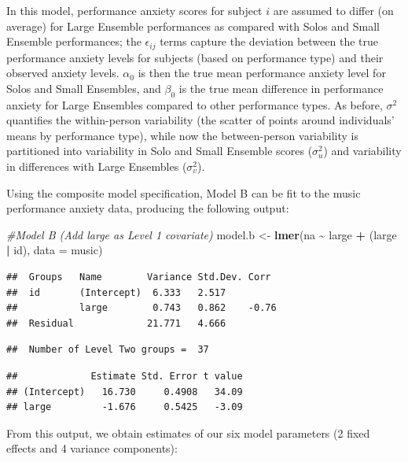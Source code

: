 \documentclass[
]{krantz}
\newenvironment{Shaded}{\begin{snugshade}}{\end{snugshade}}
\newcommand{\AttributeTok}[1]{\textcolor[rgb]{0.27,0.27,0.27}{#1}}
\newcommand{\CommentTok}[1]{\textcolor[rgb]{0.37,0.37,0.37}{\textit{#1}}}
\newcommand{\FunctionTok}[1]{\textcolor[rgb]{0.27,0.27,0.27}{\textbf{#1}}}
\newcommand{\NormalTok}[1]{#1}
\newcommand{\OtherTok}[1]{\textcolor[rgb]{0.37,0.37,0.37}{#1}}
\newcommand{\SpecialCharTok}[1]{\textcolor[rgb]{0.43,0.43,0.43}{\textbf{#1}}}
\begin{document}
In this model, performance anxiety scores for subject \(i\) are assumed to differ (on average) for Large Ensemble performances as compared with Solos and Small Ensemble performances; the \(\epsilon_{ij}\) terms capture the deviation between the true performance anxiety levels for subjects (based on performance type) and their observed anxiety levels. \(\alpha_{0}\) is then the true mean performance anxiety level for Solos and Small Ensembles, and \(\beta_{0}\) is the true mean difference in performance anxiety for Large Ensembles compared to other performance types. As before, \(\sigma^2\) quantifies the within-person variability (the scatter of points around individuals' means by performance type), while now the between-person variability is partitioned into variability in Solo and Small Ensemble scores (\(\sigma_{u}^{2}\)) and variability in differences with Large Ensembles (\(\sigma_{v}^{2}\)).

Using the composite model specification, Model B can be fit to the music performance anxiety data, producing the following output:

\begin{Shaded}
\begin{Highlighting}[]
\CommentTok{\#Model B (Add large as Level 1 covariate)}
\NormalTok{model.b }\OtherTok{\textless{}{-}} \FunctionTok{lmer}\NormalTok{(na }\SpecialCharTok{\textasciitilde{}}\NormalTok{ large }\SpecialCharTok{+}\NormalTok{  (large }\SpecialCharTok{|}\NormalTok{ id), }\AttributeTok{data =}\NormalTok{ music)}
\end{Highlighting}
\end{Shaded}

\begin{verbatim}
##  Groups   Name        Variance Std.Dev. Corr 
##  id       (Intercept)  6.333   2.517         
##           large        0.743   0.862    -0.76
##  Residual             21.771   4.666
\end{verbatim}

\begin{verbatim}
##  Number of Level Two groups =  37
\end{verbatim}

\begin{verbatim}
##             Estimate Std. Error t value
## (Intercept)   16.730     0.4908   34.09
## large         -1.676     0.5425   -3.09
\end{verbatim}

From this output, we obtain estimates of our six model parameters (2 fixed effects and 4 variance components):
\end{document}
